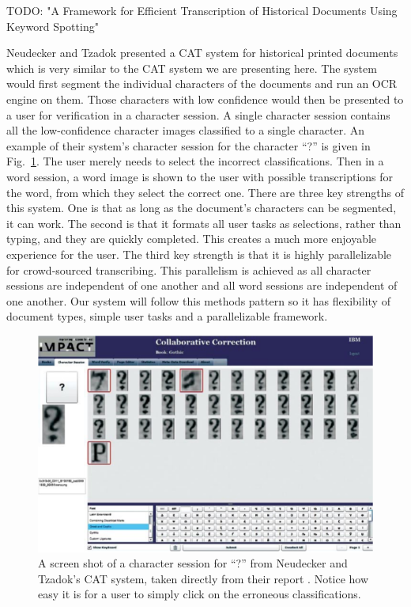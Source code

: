 \documentclass[ms]{byuprop}
\begin{document}
TODO: "A Framework for Efficient Transcription of Historical Documents Using Keyword Spotting"

Neudecker and Tzadok\cite{Neudecker2010} presented a CAT system for historical printed documents which is very similar to the CAT system we are presenting here. The system would first segment the individual characters of the documents and run an OCR engine on them. Those characters with low confidence would then be presented to a user for verification in a character session. A single character session contains all the low-confidence character images classified to a single character. An example of their system's character session for the character ``?'' is given in Fig.~\ref{fig:carpet}.  The user merely needs to select the incorrect classifications. Then in a word session, a word image is shown to the user with possible transcriptions for the word, from which they select the correct one. There are three key strengths of this system. One is that as long as the document’s characters can be segmented, it can work. The second is that it formats all user tasks as selections, rather than typing, and they are quickly completed. This creates a much more enjoyable experience for the user. The third key strength is that it is highly parallelizable for crowd-sourced transcribing. This parallelism is achieved as all character sessions are independent of one another and all word sessions are independent of one another. Our system will follow this methods pattern so it has flexibility of document types, simple user tasks and a parallelizable framework.

\begin{figure}[h]
    \centering
    \includegraphics[width=.98\textwidth]{carpet}
    \caption{A screen shot of a character session for ``?'' from Neudecker and Tzadok's CAT system, taken directly from their report \cite{Neudecker2010}. Notice how easy it is for a user to simply click on the erroneous classifications.}
    \label{fig:carpet}
\end{figure}
\end{document}
